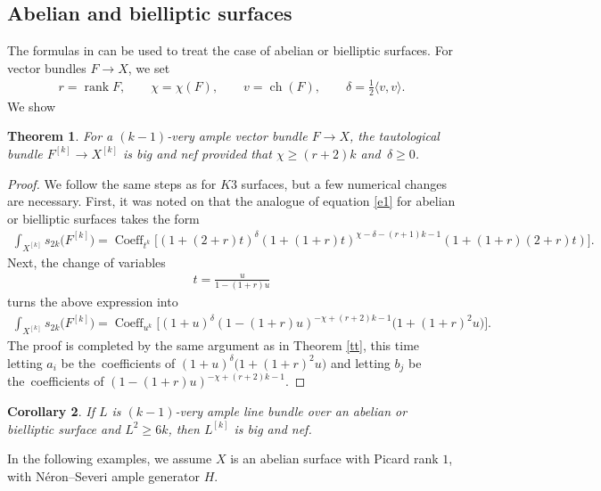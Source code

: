 \documentclass[10pt,a4paper]{amsart}
\numberwithin{equation}{section}
\newtheorem{Theorem}{Theorem}[section]
\newtheorem{Corollary}[Theorem]{Corollary}
\begin{document}
\subsection{Abelian and bielliptic surfaces}\label{ababab}
The formulas in \cite{MOP} can be used to treat the case of abelian or bielliptic surfaces. For vector bundles $F\to X$, we set\vspace{-.5ex}
\begin{gather*}
r=\operatorname{rank}F,\qquad \chi=\chi(F),\qquad v=\operatorname{ch}(F), \qquad \delta=\frac{1}{2}\langle v, v\rangle.
\end{gather*}
We show
\begin{Theorem}
For a $(k-1)$-very ample vector bundle $F\to X$,
the tautological bundle $F^{[k]}\to X^{[k]}$ is big and nef provided that
$\chi\geq (r+2)k$ and~$\delta\geq 0$.
\end{Theorem}

\begin{proof}
We follow the same steps as for $K3$ surfaces, but a few numerical changes are necessary. First, it was noted on \cite[p.~19]{MOP} that the analogue of equation \eqref{e1} for abelian or bielliptic surfaces takes the form
\begin{gather*}
\int_{X^{[k]}} s_{2k} \big(F^{[k]}\big)= \operatorname{Coeff}_{t^k}
\bigl[(1+ (2+r)t)^{\delta} (1+(1+r)t)^{\chi-\delta -(r+1)k-1} (1+(1+r)(2+r)t)\bigr].
\end{gather*}
Next, the change of variables
\begin{gather*}
t=\frac{u}{1-(1+r)u}
\end{gather*}
turns the above expression into
\begin{gather*}
\int_{X^{[k]}} s_{2k} \big(F^{[k]}\big)=\operatorname{Coeff}_{u^k}
\bigl[(1+u)^{\delta} (1-(1+r)u)^{-\chi+(r+2)k-1} \big(1+(1+r)^2u\big)\bigr].
\end{gather*}
The proof is completed by the same argument as in Theorem \ref{tt}, this time letting $a_i$ be the~coefficients of $(1+u)^{\delta}\big(1+(1+r)^2u\big)$ and letting $b_j$ be the~coefficients of $(1-(1+r)u)^{-\chi+(r+2)k-1}$.
\end{proof}

\begin{Corollary}\label{c10}
If $L$ is $(k-1)$-very ample line bundle over an abelian or bielliptic surface and $L^2\geq 6k$, then $L^{[k]}$ is big and nef.
\end{Corollary}

In the following examples, we assume $X$ is an abelian surface with Picard rank $1$, with N\'eron--Severi ample generator $H$.
\end{document}
